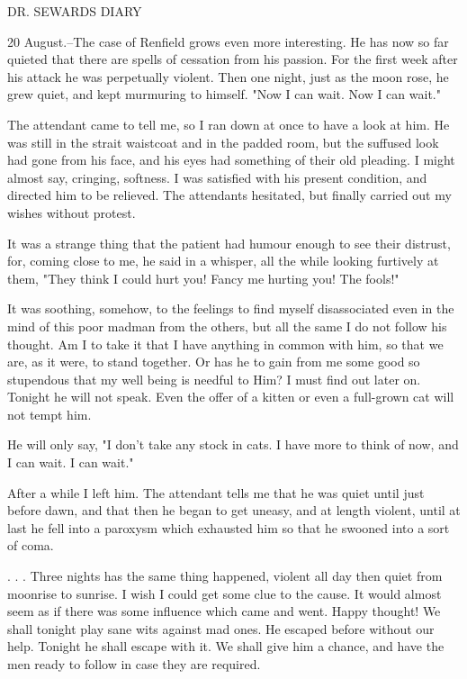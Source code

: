 DR. SEWARDS DIARY 

20 August.--The case of Renfield grows even more interesting. He has now so far quieted that there are spells of cessation from his passion. For the first week after his attack he was perpetually violent. Then one night, just as the moon rose, he grew quiet, and kept murmuring to himself. "Now I can wait. Now I can wait." 

The attendant came to tell me, so I ran down at once to have a look at him. He was still in the strait waistcoat and in the padded room, but the suffused look had gone from his face, and his eyes had something of their old pleading. I might almost say, cringing, softness. I was satisfied with his present condition, and directed him to be relieved. The attendants hesitated, but finally carried out my wishes without protest. 

It was a strange thing that the patient had humour enough to see their distrust, for, coming close to me, he said in a whisper, all the while looking furtively at them, "They think I could hurt you! Fancy me hurting you! The fools!" 

It was soothing, somehow, to the feelings to find myself disassociated even in the mind of this poor madman from the others, but all the same I do not follow his thought. Am I to take it that I have anything in common with him, so that we are, as it were, to stand together. Or has he to gain from me some good so stupendous that my well being is needful to Him? I must find out later on. Tonight he will not speak. Even the offer of a kitten or even a full-grown cat will not tempt him. 

He will only say, "I don't take any stock in cats. I have more to think of now, and I can wait. I can wait." 

After a while I left him. The attendant tells me that he was quiet until just before dawn, and that then he began to get uneasy, and at length violent, until at last he fell into a paroxysm which exhausted him so that he swooned into a sort of coma. 

. . . Three nights has the same thing happened, violent all day then quiet from moonrise to sunrise. I wish I could get some clue to the cause. It would almost seem as if there was some influence which came and went. Happy thought! We shall tonight play sane wits against mad ones. He escaped before without our help. Tonight he shall escape with it. We shall give him a chance, and have the men ready to follow in case they are required. 

